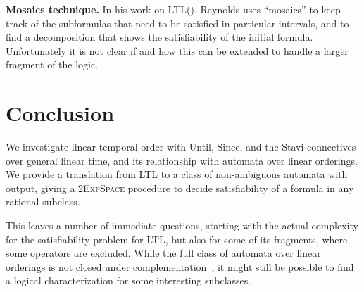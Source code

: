 \documentclass[envcountsame]{fsttcs-ps}
\newcommand{\until}{{Until}\xspace}
\newcommand{\since}{{Since}\xspace}
\newcommand{\expspace}{\textsc{ExpSpace}\xspace}
\begin{document}
\noindent \textbf{Mosaics technique.}  In his work on LTL(), Reynolds
uses ``mosaics'' to keep track of the subformulas that need to be satisfied in
particular intervals, and to find a decomposition that shows the
satisfiability of the initial formula.  Unfortunately it is not clear if and
how this can be extended to handle a larger fragment of the logic.

\section{Conclusion}

We investigate linear temporal order with \until, \since, and the Stavi
connectives over general linear time, and its relationship with automata over
linear orderings.  We provide a translation from LTL to a class of
non-ambiguous automata with output, giving a 2\expspace procedure to decide
satisfiability of a formula in any rational subclass.

This leaves a number of immediate questions, starting with the actual
complexity for the satisfiability problem for LTL, but also for some of its
fragments, where some operators are excluded.  While the full class of
automata over linear orderings is not closed under
complementation~\cite{DBLP:conf/csr/BedonBCR08}, it might still be possible to
find a logical characterization for some interesting subclasses.


{\small}
\end{document}
